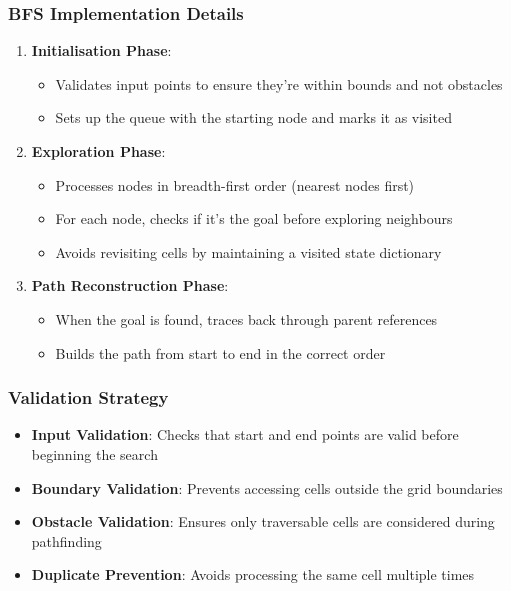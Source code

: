 \subsubsection{BFS Implementation Details}
\begin{enumerate}
    \item \textbf{Initialisation Phase}:
    \begin{itemize}
        \item Validates input points to ensure they're within bounds and not obstacles
        \item Sets up the queue with the starting node and marks it as visited
    \end{itemize}
    \item \textbf{Exploration Phase}:
    \begin{itemize}
        \item Processes nodes in breadth-first order (nearest nodes first)
        \item For each node, checks if it's the goal before exploring neighbours
        \item Avoids revisiting cells by maintaining a visited state dictionary
    \end{itemize}
    \item \textbf{Path Reconstruction Phase}:
    \begin{itemize}
        \item When the goal is found, traces back through parent references
        \item Builds the path from start to end in the correct order
    \end{itemize}
\end{enumerate}

\subsubsection{Validation Strategy}
\begin{itemize}
    \item \textbf{Input Validation}: Checks that start and end points are valid before beginning the search
    \item \textbf{Boundary Validation}: Prevents accessing cells outside the grid boundaries
    \item \textbf{Obstacle Validation}: Ensures only traversable cells are considered during pathfinding
    \item \textbf{Duplicate Prevention}: Avoids processing the same cell multiple times
\end{itemize}

